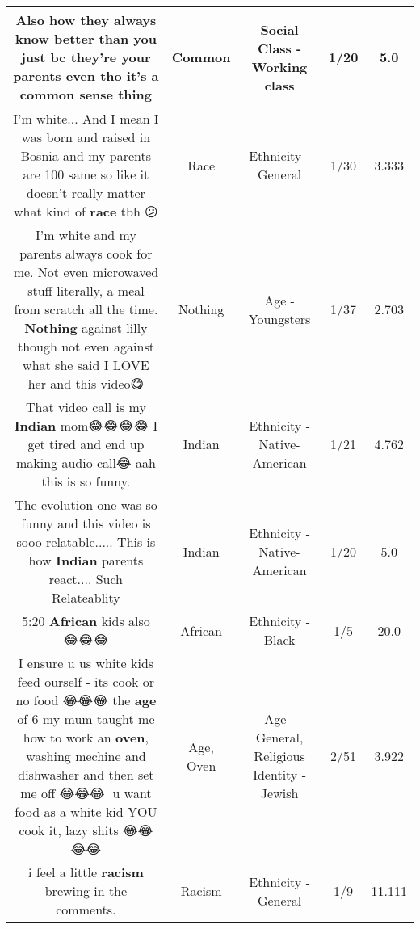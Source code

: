 \documentclass[11pt]{article}
\newlength\mylength
\begin{document}
\begin{center}
\begin{longtable}{|C{.65\mylength}|C{.30\mylength}|C{.12\mylength}|C{.12\mylength}|C{.12\mylength}|}
  \small Also how they always know better than you just bc they're your parents even tho it's a \textbf{common} sense thing\normalsize   & Common & Social Class - Working class & 1/20 & 5.0 \\  \hline
  \small I'm white... And I mean I was born and raised in Bosnia and my parents are 100 same so like it doesn't really matter what kind of \textbf{race} tbh 😕\normalsize   & Race & Ethnicity - General & 1/30 & 3.333 \\  \hline
  \small I'm white and my parents always cook for me. Not even microwaved stuff literally, a meal from scratch all the time. \textbf{Nothing} against lilly though not even against what she said I LOVE her and this video😋\normalsize   & Nothing & Age - Youngsters & 1/37 & 2.703 \\  \hline
  \small That video call is my \textbf{Indian} mom😂😂😂😂 I get tired and end up making audio call😂 aah this is so funny.\normalsize   & Indian & Ethnicity - Native-American & 1/21 & 4.762 \\  \hline
  \small The evolution one was so funny and this video is sooo relatable..... This is how \textbf{Indian} parents react.... Such Relateablity\normalsize   & Indian & Ethnicity - Native-American & 1/20 & 5.0 \\  \hline
  \small 5:20 \textbf{African} kids also 😂😂😂\normalsize   & African & Ethnicity - Black & 1/5 & 20.0 \\  \hline
  \small I ensure u us white kids feed ourself - its cook or no food 😂😂😂 the \textbf{age} of 6 my mum taught me how to work an \textbf{oven}, washing mechine and dishwasher and then set me off 😂😂😂👏 u want food as a white kid YOU cook it, lazy shits 😂😂😂😂\normalsize   & Age, Oven & Age - General, Religious Identity - Jewish & 2/51 & 3.922 \\  \hline
  \small i feel a little \textbf{racism} brewing in the comments.\normalsize   & Racism & Ethnicity - General & 1/9 & 11.111 \\  \hline

\end{longtable}
\end{center}
\end{document}
